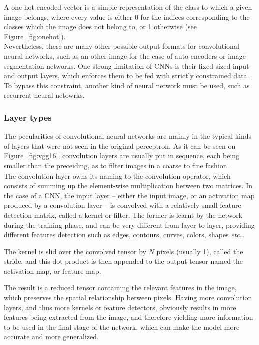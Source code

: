 A one-hot encoded vector is a simple representation of the class to which a
given image belongs, where every value is either 0 for the indices corresponding
to the classes which the image does not belong to, or 1 otherwise (see
Figure~\ref{fig:onehot}).\\

Nevertheless, there are many other possible output formats for convolutional
neural networks, such as an other image for the case of auto-encoders or image
segmentation networks. One strong limitation of CNNs is their fixed-sized
input and output layers, which enforces them to be fed with strictly
constrained data. To bypass this constraint, another kind of neural network
must be used, such as recurrent neural netowrks.

	\subsubsection{Layer types}

The pecularities of convolutional neural networks are mainly in the typical
kinds of layers that were not seen in the original perceptron. As it can be seen
on Figure~\ref{fig:vgg16}, convolution layers are usually put in sequence, each
being smaller than the preceiding, as to filter images in a coarse to fine
fashion.\\

The convolution layer owns its naming to the convolution operator, which
consists of summing up the element-wise multiplication between two matrices. In
the case of a CNN, the input layer -- either the input image, or an activation
map produced by a convolution layer -- is convolved with a relatively small
feature detection matrix, called a kernel or filter. The former is learnt by the
network during the training phase, and can be very different from layer to
layer, providing different features detection such as edges, contours, curves,
colors, shapes \emph{etc}\ldots

The kernel is slid over the convolved tensor by $N$ pixels (usually 1), called
the stride, and this dot-product is then appended to the output tensor named
the activation map, or feature map.

The result is a reduced tensor containing the relevant features in the image,
which preserves the spatial relationship between pixels. Having more convolution
layers, and thus more kernels or feature detectors, obviously results in more
features being extracted from the image, and therefore yielding more information
to be used in the final stage of the network, which can make the model more
accurate and more generalized.

